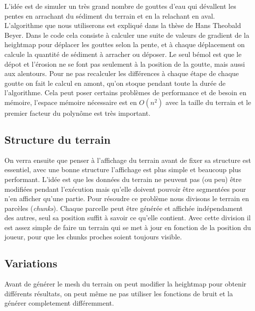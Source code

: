 \documentclass[11pt]{article} %
\begin{document}
L'idée est de simuler un très grand nombre de gouttes d'eau qui dévallent les pentes en arrachant du sédiment du terrain et en la relachant en aval. L'algorithme que nous utiliserons est expliqué dans la thèse de Hans Theobald Beyer\cite{erosion}.
Dans le code cela consiste à calculer une suite de valeurs de gradient de la heightmap pour déplacer les gouttes selon la pente, et à chaque déplacement on calcule la quantité de sédiment à arracher ou déposer. Le seul bémol est que le dépot et l'érosion ne se font pas seulement à la position de la goutte, mais aussi aux alentours. Pour ne pas recalculer les différences à chaque étape de chaque goutte on fait le calcul en amont, qu'on stoque pendant toute la durée de l'algorithme. Cela peut poser certains problèmes de performance et de besoin en mémoire, l'espace mémoire nécessaire est en $O(n^2)$ avec la taille du terrain et le premier facteur du polynôme est très important.


\subsection{Structure du terrain}

On verra ensuite que penser à l'affichage du terrain avant de fixer sa structure est essentiel, avec une bonne structure l'affichage est plus simple et beaucoup plus performant. L'idée est que les données du terrain ne peuvent pas (ou peu) être modifiées pendant l'exécution mais qu'elle doivent pouvoir être segmentées pour n'en afficher qu'une partie.
Pour résoudre ce problème nous divisons le terrain en parcèles (\textit{chunks}). Chaque parcelle peut être générée et affichée indépendament des autres, seul sa position suffit à savoir ce qu'elle contient.
Avec cette division il est assez simple de faire un terrain qui se met à jour en fonction de la position du joueur, pour que les chunks proches soient toujours visible.




\subsection{Variations}

Avant de générer le mesh du terrain on peut modifier la heightmap pour obtenir différents résultats, on peut même ne pas utiliser les fonctions de bruit et la générer completement différemment.
\end{document}
